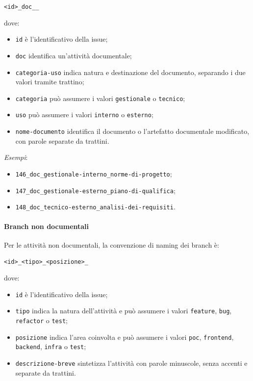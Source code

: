 \begin{center}
    \texttt{<id>\_doc\_<categoria-uso>\_<nome-documento>}
\end{center}

dove:

\begin{itemize}
    \item \texttt{id} è l'identificativo della issue;
    \item \texttt{doc} identifica un'attività documentale;
    \item \texttt{categoria-uso} indica natura e destinazione del documento,
    separando i due valori tramite trattino;
    \item \texttt{categoria} può assumere i valori \texttt{gestionale} o
    \texttt{tecnico};
    \item \texttt{uso} può assumere i valori \texttt{interno} o \texttt{esterno};
    \item \texttt{nome-documento} identifica il documento o l'artefatto documentale
    modificato, con parole separate da trattini.
\end{itemize}

\textit{Esempi}:

\begin{itemize}
    \item \texttt{146\_doc\_gestionale-interno\_norme-di-progetto};
    \item \texttt{147\_doc\_gestionale-esterno\_piano-di-qualifica};
    \item \texttt{148\_doc\_tecnico-esterno\_analisi-dei-requisiti}.
\end{itemize}

\paragraph{Branch non documentali}

Per le attività non documentali, la convenzione di naming dei branch è:

\begin{center}
    \texttt{<id>\_<tipo>\_<posizione>\_<descrizione-breve>}
\end{center}

dove:

\begin{itemize}
    \item \texttt{id} è l'identificativo della issue;
    \item \texttt{tipo} indica la natura dell'attività e può assumere i valori
    \texttt{feature}, \texttt{bug}, \texttt{refactor} o \texttt{test};
    \item \texttt{posizione} indica l'area coinvolta e può assumere i valori
    \texttt{poc}, \texttt{frontend}, \texttt{backend}, \texttt{infra} o \texttt{test};
    \item \texttt{descrizione-breve} sintetizza l'attività con parole minuscole,
    senza accenti e separate da trattini.
\end{itemize}

